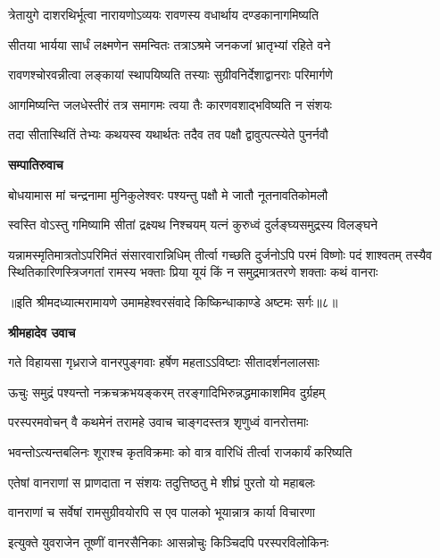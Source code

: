 \twolineshloka
{त्रेतायुगे दाशरथिर्भूत्वा नारायणोऽव्ययः}
{रावणस्य वधार्थाय दण्डकानागमिष्यति} %

\twolineshloka
{सीतया भार्यया सार्धं लक्ष्मणेन समन्वितः}
{तत्राऽश्रमे जनकजां भ्रातृभ्यां रहिते वने} %

\twolineshloka
{रावणश्चोरवन्नीत्वा लङ्कायां स्थापयिष्यति}
{तस्याः सुग्रीवनिर्देशाद्वानराः परिमार्गणे} %

\twolineshloka
{आगमिष्यन्ति जलधेस्तीरं तत्र समागमः}
{त्वया तैः कारणवशाद्भविष्यति न संशयः} %

\twolineshloka
{तदा सीतास्थितिं तेभ्यः कथयस्व यथार्थतः}
{तदैव तव पक्षौ द्वावुत्पत्स्येते पुनर्नवौ} %

\textbf{सम्पातिरुवाच}

\twolineshloka
{बोधयामास मां चन्द्रनामा मुनिकुलेश्वरः}
{पश्यन्तु पक्षौ मे जातौ नूतनावतिकोमलौ} %

\twolineshloka
{स्वस्ति वोऽस्तु गमिष्यामि सीतां द्रक्ष्यथ निश्चयम्}
{यत्नं कुरुध्वं दुर्लङ्घ्यसमुद्रस्य विलङ्घने} %

\fourlineindentedshloka
{यन्नामस्मृतिमात्रतोऽपरिमितं संसारवारान्निधिम्}
{तीर्त्वा गच्छति दुर्जनोऽपि परमं विष्णोः पदं शाश्वतम्}
{तस्यैव स्थितिकारिणस्त्रिजगतां रामस्य भक्ताः प्रिया}
{यूयं किं न समुद्रमात्रतरणे शक्ताः कथं वानराः} %

{॥इति श्रीमदध्यात्मरामायणे उमामहेश्वरसंवादे किष्किन्धाकाण्डे
अष्टमः सर्गः॥८॥}




\textbf{श्रीमहादेव उवाच}

\twolineshloka
{गते विहायसा गृध्रराजे वानरपुङ्गवाः}
{हर्षेण महताऽऽविष्टाः सीतादर्शनलालसाः} %

\twolineshloka
{ऊचुः समुद्रं पश्यन्तो नक्रचक्रभयङ्करम्}
{तरङ्गादिभिरुन्नद्धमाकाशमिव दुर्ग्रहम्} %

\twolineshloka
{परस्परमवोचन् वै कथमेनं तरामहे}
{उवाच चाङ्गदस्तत्र शृणुध्वं वानरोत्तमाः} %

\twolineshloka
{भवन्तोऽत्यन्तबलिनः शूराश्च कृतविक्रमाः}
{को वात्र वारिधिं तीर्त्वा राजकार्यं करिष्यति} %

\twolineshloka
{एतेषां वानराणां स प्राणदाता न संशयः}
{तदुत्तिष्ठतु मे शीघ्रं पुरतो यो महाबलः} %

\twolineshloka
{वानराणां च सर्वेषां रामसुग्रीवयोरपि}
{स एव पालको भूयान्नात्र कार्या विचारणा} %

\twolineshloka
{इत्युक्ते युवराजेन तूष्णीं वानरसैनिकाः}
{आसन्नोचुः किञ्चिदपि परस्परविलोकिनः} %

